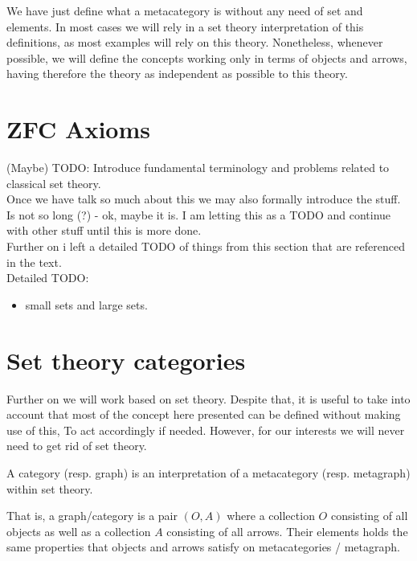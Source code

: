 We have just define what a  metacategory is without any need of set and elements. In most cases we will rely in a set theory interpretation of this definitions, as most examples will rely on this theory. Nonetheless, whenever possible, we will define the concepts working only in terms of objects and arrows, having therefore the theory as independent as possible to this theory.




\section{ZFC Axioms}
{\color{red}(Maybe) TODO}: Introduce fundamental terminology and problems related to classical set theory.\\

Once we have talk so much about this we may also formally introduce the stuff. Is not so long (?)  - ok, maybe it is. I am letting this as a TODO and continue with other stuff until this is more done.\\

Further on i left a detailed TODO of things from this section that are referenced in the text.\\

Detailed TODO:
\begin{itemize}
\item small sets and large sets.
\end{itemize}


\section{Set theory categories}
Further on we will work based on set theory. Despite that, it is useful to take into account that most of the concept here presented can be defined without making use of this, To act accordingly if needed. However, for our interests we will never need to get rid of set theory.

\begin{definition}
  A category (resp. graph) is an interpretation of a metacategory (resp. metagraph) within set theory.
\end{definition}


That is, a graph/category is a pair $(O,A)$ where a collection $O$ consisting of all objects as well as a collection $A$ consisting of all arrows. Their elements holds the same properties that objects and arrows satisfy on metacategories / metagraph.\\


